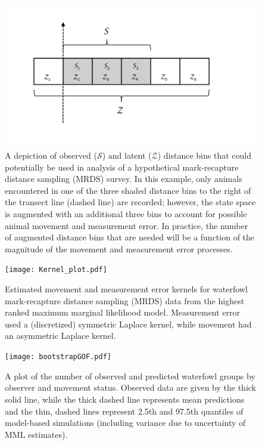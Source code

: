 \documentclass[aoas,preprint]{imsart}
\numberwithin{equation}{section}
\theoremstyle{plain}
\begin{document}
\pagebreak
\begin{figure}
\begin{center}
\includegraphics[width=150mm]{augmented_bin_figure.pdf}
\caption{A depiction of observed ($\mathcal{S}$) and latent ($\mathcal{Z}$) distance bins that could potentially be used in analysis of a hypothetical mark-recapture distance sampling (MRDS) survey.  In this example, only animals encountered in one of the three shaded distance bins to the right of the transect line (dashed line) are recorded; however, the state space is augmented with an additional three bins to account for possible animal movement and measurement error.  In practice, the number of augmented distance bins that are needed will be a function of the magnitude of the movement and measurement error processes.}
\label{fig:aug_bins}
\end{center}
\end{figure}


\pagebreak
\begin{figure}
\begin{center}
\texttt{[image: Kernel\_plot.pdf]}
\caption{Estimated movement and measurement error kernels for waterfowl mark-recapture distance sampling (MRDS) data from the highest ranked maximum marginal likelihood model. Measurement error used a (discretized) symmetric Laplace kernel, while movement had an asymmetric Laplace kernel.}
\label{fig:kernel}
\end{center}
\end{figure}

\pagebreak
\begin{figure}
\begin{center}
\texttt{[image: bootstrapGOF.pdf]}
\caption{A plot of the number of observed and predicted waterfowl groups by observer and movement status.  Observed data are given by the thick solid line, while the thick dashed line represents mean predictions and the thin, dashed lines represent 2.5th and 97.5th quantiles of model-based simulations (including variance due to uncertainty of MML estimates).  }
\label{fig:GOF}
\end{center}
\end{figure}
\end{document}
